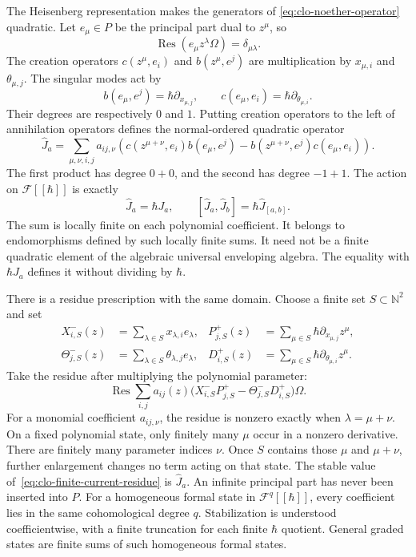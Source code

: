 The Heisenberg representation makes the generators of
\eqref{eq:clo-noether-operator} quadratic.
Let $e_\mu\in P$ be the principal part dual to $z^\mu$, so
\[
 \operatorname{Res}(e_\mu z^\lambda\Omega)=\delta_{\mu\lambda}.
\]
The creation operators $c(z^\mu,e_i)$ and $b(z^\mu,e^j)$ are
multiplication by $x_{\mu,i}$ and $\theta_{\mu,j}$.
The singular modes act by
\[
 b(e_\mu,e^j)=\hbar\partial_{x_{\mu,j}},\qquad
 c(e_\mu,e_i)=\hbar\partial_{\theta_{\mu,i}}.
\]
Their degrees are respectively $0$ and $1$.
Putting creation operators to the left of annihilation operators defines
the normal-ordered quadratic operator
\[
 \widehat J_a=\sum_{\mu,\nu,i,j}a_{ij,\nu}
 \left(
 c(z^{\mu+\nu},e_i)b(e_\mu,e^j)
 -b(z^{\mu+\nu},e^j)c(e_\mu,e_i)
 \right).
\]
The first product has degree $0+0$, and the second has degree $-1+1$.
The action on $\mathcal F[[\hbar]]$ is exactly
\begin{equation}\label{eq:clo-scaled-current}
 \widehat J_a=\hbar J_a,
 \qquad [\widehat J_a,\widehat J_b]
       =\hbar\widehat J_{[a,b]}.
\end{equation}
The sum is locally finite on each polynomial coefficient.
It belongs to endomorphisms defined by such locally finite sums.
It need not be a finite quadratic element of the algebraic universal
enveloping algebra.
The equality with $\hbar J_a$ defines it without dividing by $\hbar$.

There is a residue prescription with the same domain.
Choose a finite set $S\subset\mathbb N^2$ and set
\[
 \begin{aligned}
 X^-_{i,S}(z)&=\sum_{\lambda\in S}x_{\lambda,i}e_\lambda,&
 P^+_{j,S}(z)&=\sum_{\mu\in S}\hbar\partial_{x_{\mu,j}}z^\mu,\\
 \Theta^-_{j,S}(z)&=\sum_{\lambda\in S}\theta_{\lambda,j}e_\lambda,&
 D^+_{i,S}(z)&=\sum_{\mu\in S}\hbar\partial_{\theta_{\mu,i}}z^\mu.
 \end{aligned}
\]
Take the residue after multiplying the polynomial parameter:
\begin{equation}\label{eq:clo-finite-current-residue}
 \operatorname{Res}\sum_{i,j}a_{ij}(z)
 \bigl(X^-_{i,S}P^+_{j,S}-\Theta^-_{j,S}D^+_{i,S}\bigr)\Omega.
\end{equation}
For a monomial coefficient $a_{ij,\nu}$, the residue is nonzero
exactly when $\lambda=\mu+\nu$.
On a fixed polynomial state, only finitely many $\mu$ occur in a
nonzero derivative. There are finitely many parameter indices $\nu$.
Once $S$ contains those $\mu$ and $\mu+\nu$, further enlargement
changes no term acting on that state.
The stable value of~\eqref{eq:clo-finite-current-residue} is
$\widehat J_a$.
An infinite principal part has never been inserted into $P$.
For a homogeneous formal state in $\mathcal F^q[[\hbar]]$, every
coefficient lies in the same cohomological degree $q$.
Stabilization is understood coefficientwise, with a finite truncation for
each finite $\hbar$ quotient. General graded states are finite sums of
such homogeneous formal states.

